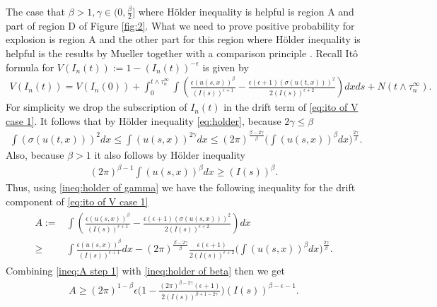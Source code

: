 \documentclass[12pt]{article}
\numberwithin{equation}{section}
\begin{document}
The case that $\beta>1,\gamma\in (0,\frac{\beta}{2}]$ where H\"older inequality is helpful is region A and part of region D of Figure \ref{fig:2}. What we need to prove positive probability for explosion is region A and the other part for this region where H\"older inequality is helpful is the results by Mueller \cite{Mueller2000} together with a comparison principle \cite{Kotelenez1992,Mueller199101}. Recall It\^{o} formula for $V(I_n(t)):=1-(I_n(t))^{-\epsilon}$ is given by
\begin{align}
     V(I_n(t))=V(I_n(0))+\int_0^{t\land\tau_n^\infty}\int \left(\frac{\epsilon (u(s,x))^{\beta}}{(I(s))^{\epsilon+1}}-\frac{\epsilon(\epsilon+1)(\sigma(u(t,x)))^2}{2(I(s))^{\epsilon+2}}\right)dxds+N(t\land \tau_n^\infty).\label{eq:ito of V case 1}
\end{align}
For simplicity we drop the subscription of $I_n(t)$ in the drift term of \eqref{eq:ito of V case 1}. It follows that 
by H\"older inequality \eqref{eq:holder}, because $2\gamma\leq\beta$ 
\begin{align}
    \int(\sigma(u(t,x)))^2dx\leq \int(u(s,x))^{2\gamma}dx\leq (2\pi)^{\frac{\beta-2\gamma}{\beta}}\Big(\int(u(s,x))^{\beta}dx\Big)^{\frac{2\gamma}{\beta}}.\label{ineq:holder of gamma}
\end{align}
Also, because $\beta>1$ it also follows by H\"older inequality
\begin{align}
   (2\pi)^{\beta-1} \int(u(s,x))^{\beta}dx\geq  (I(s))^{\beta}.\label{ineq:holder of beta}
\end{align}
Thus, using \eqref{ineq:holder of gamma} we have the following inequality for the drift component of \eqref{eq:ito of V case 1}
\begin{align}
   \begin{split}
       A:= &\int\left( \frac{\epsilon (u(s,x))^{\beta}}{(I(s))^{\epsilon+1}}-\frac{\epsilon(\epsilon+1)(\sigma(u(s,x)))^2}{2(I(s))^{\epsilon+2}}\right)dx\\
    \geq & \int \frac{\epsilon (u(s,x))^{\beta}}{(I(s))^{\epsilon+1}}dx-(2\pi)^{\frac{\beta-2\gamma}{\beta}}\frac{\epsilon(\epsilon+1)}{2(I(s))^{\epsilon+2}}\Big(\int(u(s,x))^{\beta}dx\Big)^{\frac{2\gamma}{\beta}}.
   \end{split}\label{ineq:A step 1}
\end{align}
Combining \eqref{ineq:A step 1} with \eqref{ineq:holder of beta} then we get
\begin{align}
    A\geq (2\pi)^{1-\beta}\epsilon\Big(1-\frac{(2\pi)^{\beta-2\gamma}(\epsilon+1)}{2(I(s))^{\beta+1-2\gamma}}\Big)(I(s))^{\beta-\epsilon-1}\label{ineq:A step 2}.
\end{align}
\end{document}
